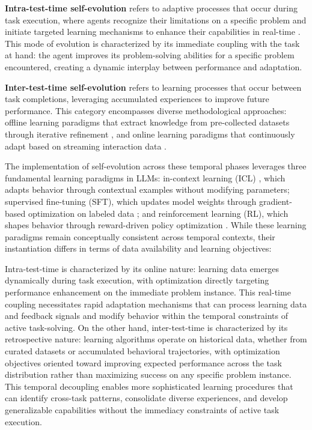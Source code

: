 \documentclass[10pt]{article} %
\begin{document}
\textbf{Intra-test-time self-evolution} refers to adaptive processes that occur during task execution, where agents recognize their limitations on a specific problem and initiate targeted learning mechanisms to enhance their capabilities in real-time \citep{xi2024enhancing, bi2024forest}. This mode of evolution is characterized by its immediate coupling with the task at hand: the agent improves its problem-solving abilities for a specific problem encountered, creating a dynamic interplay between performance and adaptation.

\textbf{Inter-test-time self-evolution} refers to learning processes that occur between task completions, leveraging accumulated experiences to improve future performance. This category encompasses diverse methodological approaches: offline learning paradigms that extract knowledge from pre-collected datasets through iterative refinement \citep{zelikman2022star, zelikman2024quiet}, and online learning paradigms that continuously adapt based on streaming interaction data \citep{qi2024webrl, qiu2025alita, qian2024new, wang2025mobile}. 

The implementation of self-evolution across these temporal phases leverages three fundamental learning paradigms in LLMs: in-context learning (ICL) \citep{dong2022survey, min2021metaicl, wies2023learnability}, which adapts behavior through contextual examples without modifying parameters; supervised fine-tuning (SFT), which updates model weights through gradient-based optimization on labeled data \citep{devlin2018bert, shen2024rethinking, dong2023abilities}; and reinforcement learning (RL), which shapes behavior through reward-driven policy optimization \citep{kaelbling1996reinforcement, sun2024llm,zhang2025nemotron}. While these learning paradigms remain conceptually consistent across temporal contexts, their instantiation differs in terms of data availability and learning objectives:


Intra-test-time is characterized by its online nature: learning data emerges dynamically during task execution, with optimization directly targeting performance enhancement on the immediate problem instance. This real-time coupling necessitates rapid adaptation mechanisms that can process learning data and feedback signals and modify behavior within the temporal constraints of active task-solving. On the other hand, inter-test-time is characterized by its retrospective nature: learning algorithms operate on historical data, whether from curated datasets or accumulated behavioral trajectories, with optimization objectives oriented toward improving expected performance across the task distribution rather than maximizing success on any specific problem instance. This temporal decoupling enables more sophisticated learning procedures that can identify cross-task patterns, consolidate diverse experiences, and develop generalizable capabilities without the immediacy constraints of active task execution.
\end{document}
